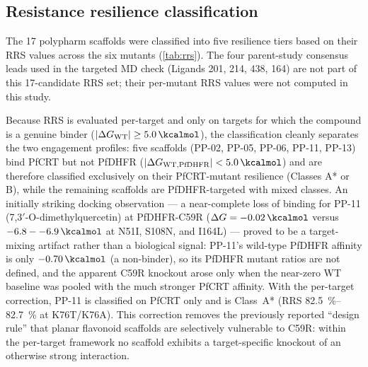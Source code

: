 \documentclass[11pt,a4paper]{article}
\begin{document}
\subsection{Resistance resilience classification}

The 17 polypharm scaffolds were classified into five resilience tiers based on their RRS values across the six mutants (\cref{tab:rrs}). The four parent-study consensus leads used in the targeted MD check (Ligands 201, 214, 438, 164) are not part of this 17-candidate RRS set; their per-mutant RRS values were not computed in this study.

Because RRS is evaluated per-target and only on targets for which the compound is a genuine binder ($|\Delta G_{\mathrm{WT}}| \geq \SI{5.0}{\kcalmol}$), the classification cleanly separates the two engagement profiles: five scaffolds (PP-02, PP-05, PP-06, PP-11, PP-13) bind PfCRT but not PfDHFR ($|\Delta G_{\mathrm{WT},\mathrm{PfDHFR}}| < \SI{5.0}{\kcalmol}$) and are therefore classified exclusively on their PfCRT-mutant resilience (Classes A* or B), while the remaining scaffolds are PfDHFR-targeted with mixed classes. An initially striking docking observation --- a near-complete loss of binding for PP-11 (7,3$'$-O-dimethylquercetin) at PfDHFR-C59R ($\Delta G = -\SI{0.02}{\kcalmol}$ versus $-\SIrange{6.8}{6.9}{\kcalmol}$ at N51I, S108N, and I164L) --- proved to be a target-mixing artifact rather than a biological signal: PP-11's wild-type PfDHFR affinity is only $-\SI{0.70}{\kcalmol}$ (a non-binder), so its PfDHFR mutant ratios are not defined, and the apparent C59R knockout arose only when the near-zero WT baseline was pooled with the much stronger PfCRT affinity. With the per-target correction, PP-11 is classified on PfCRT only and is Class~A* (RRS \qtyrange{82.5}{82.7}{\percent} at K76T/K76A). This correction removes the previously reported ``design rule'' that planar flavonoid scaffolds are selectively vulnerable to C59R: within the per-target framework no scaffold exhibits a target-specific knockout of an otherwise strong interaction.
\end{document}
